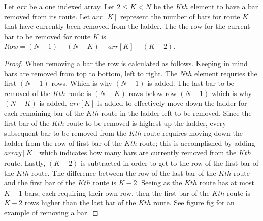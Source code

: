 

\begin{lemma}
  Let $arr$ be a one indexed array. Let $2 \leq K < N$ be the $Kth$ element to have a bar removed from its route. 
  Let $arr[K]$ represent the number of bars for route $K$ that have currently been removed from the ladder. 
  The the row for the current bar to be removed for route $K$ is $Row=(N-1) + (N-K) + arr[K] - (K-2)$.
\end{lemma}
\begin{proof}
  When removing a bar the row is calculated as follows. Keeping in mind bars are removed from top to bottom, left to right.
  The $Nth$ element requries the first $(N-1)$ rows. Which is why $(N-1)$ is added. The last bar to be removed of the $Kth$ route is $(N-K)$
  rows below row $(N-1)$ which is why $(N-K)$ is added. $arr[K]$ is added to effectively move down the ladder 
  for each remaining bar of the $Kth$ route in the ladder left to be removed. Since the first bar of the $Kth$ route 
  to be removed is highest up the ladder, every subsequent bar to be removed from the $Kth$ route requires 
  moving down the ladder from the row of first bar of the $Kth$ route; this is accomplished by adding $array[K]$ which 
  indicates how many bars are currently removed from the $Kth$ route. Lastly, $(K-2)$  is subtracted in order to 
  get to the row of the first bar of the $Kth$ route. The difference between the row of the last bar of the $Kth$ route and 
  the first bar of the $Kth$ route is $K-2$. Seeing as the $Kth$ route has at most $K-1$ bars, each requiring their own row, then the 
  first bar of the $Kth$ route is $K-2$ rows higher than the last bar of the $Kth$ route. See figure fig for 
  an example of removing a bar.\pagebreak
\end{proof}

